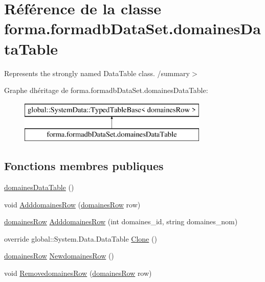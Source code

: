\hypertarget{classforma_1_1formadb_data_set_1_1domaines_data_table}{}\section{Référence de la classe forma.\+formadb\+Data\+Set.\+domaines\+Data\+Table}
\label{classforma_1_1formadb_data_set_1_1domaines_data_table}


Represents the strongly named Data\+Table class. /summary$>$  


Graphe d\textquotesingle{}héritage de forma.\+formadb\+Data\+Set.\+domaines\+Data\+Table\+:\begin{figure}[H]
\begin{center}
\leavevmode
\includegraphics[height=2.000000cm]{classforma_1_1formadb_data_set_1_1domaines_data_table}
\end{center}
\end{figure}
\subsection*{Fonctions membres publiques}
\begin{DoxyCompactItemize}
\item 
\hyperlink{classforma_1_1formadb_data_set_1_1domaines_data_table_ac35002cb6ada6b75dbd37db2eb718dd8}{domaines\+Data\+Table} ()
\item 
void \hyperlink{classforma_1_1formadb_data_set_1_1domaines_data_table_a268d11d843da122a3e4c6acfb77ad947}{Adddomaines\+Row} (\hyperlink{classforma_1_1formadb_data_set_1_1domaines_row}{domaines\+Row} row)
\item 
\hyperlink{classforma_1_1formadb_data_set_1_1domaines_row}{domaines\+Row} \hyperlink{classforma_1_1formadb_data_set_1_1domaines_data_table_aa60098d62c552d6553d3a692f60b6ebe}{Adddomaines\+Row} (int domaines\+\_\+id, string domaines\+\_\+nom)
\item 
override global\+::\+System.\+Data.\+Data\+Table \hyperlink{classforma_1_1formadb_data_set_1_1domaines_data_table_a0a450e41f13c7905fbc67d13546a3fff}{Clone} ()
\item 
\hyperlink{classforma_1_1formadb_data_set_1_1domaines_row}{domaines\+Row} \hyperlink{classforma_1_1formadb_data_set_1_1domaines_data_table_aae52523e370b37aedfcaac14c22ac1ea}{Newdomaines\+Row} ()
\item 
void \hyperlink{classforma_1_1formadb_data_set_1_1domaines_data_table_a8a0256b2099db52342a631756552bfa8}{Removedomaines\+Row} (\hyperlink{classforma_1_1formadb_data_set_1_1domaines_row}{domaines\+Row} row)
\end{DoxyCompactItemize}
